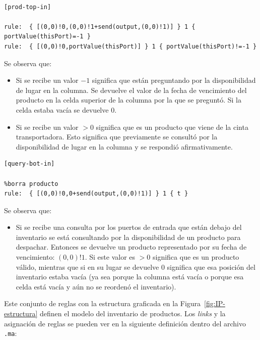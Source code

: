 \documentclass[10pt]{article}
\begin{document}
\begin{minipage}{1\textwidth}
	\centering
	\begin{lstlisting}

[prod-top-in]

rule:  { [(0,0)!0,(0,0)!1+send(output,(0,0)!1)] } 1 { portValue(thisPort)=-1 }
rule:  { [(0,0)!0,portValue(thisPort)] } 1 { portValue(thisPort)!=-1 }
	\end{lstlisting}
\end{minipage}

Se observa que:
\begin{itemize}
  \item Si se recibe un valor $-1$ significa que están preguntando por la disponibilidad de lugar en la columna. Se devuelve el valor de la fecha de vencimiento del producto en la celda superior de la columna por la que se preguntó. Si la celda estaba vacía se devuelve $0$.
  \item Si se recibe un valor $>0$ significa que es un producto que viene de la cinta transportadora. Esto significa que previamente se consultó por la disponibilidad de lugar en la columna y se respondió afirmativamente.
\end{itemize}

\begin{minipage}{1\textwidth}
	\centering
	\begin{lstlisting}
[query-bot-in]

%borra producto
rule:  { [(0,0)!0,0+send(output,(0,0)!1)] } 1 { t }
	\end{lstlisting}
\end{minipage}

Se observa que:
\begin{itemize}
  \item Si se recibe una consulta por los puertos de entrada que están debajo del inventario se está consultando por la disponibilidad de un producto para despachar. Entonces se devuelve un producto representado por su fecha de vencimiento: $(0,0)!1$. Si este valor es $>0$ significa que es un producto válido, mientras que si en su lugar se devuelve $0$ significa que esa posición del inventario estaba vacía (ya sea porque la columna está vacía o porque esa celda está vacía y aún no se reordenó el inventario).
\end{itemize}

Este conjunto de reglas con la estructura graficada en la Figura~\ref{fig:IP-estructura} definen el modelo del inventario de productos. Los \textit{links} y la asignación de reglas se pueden ver en la siguiente definición dentro del archivo \texttt{.ma}:
\end{document}
